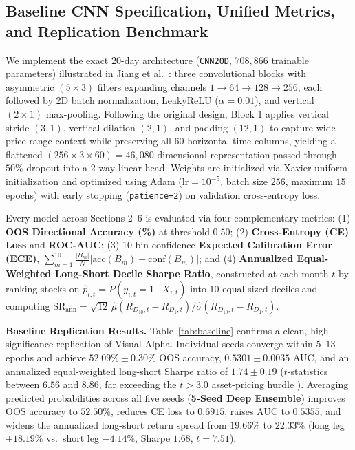 \documentclass[10pt]{article}
\begin{document}
\subsection{Baseline CNN Specification, Unified Metrics, and Replication Benchmark}
We implement the exact 20-day architecture (\texttt{CNN20D}, $708,866$ trainable parameters) illustrated in Jiang et al.\ \cite{jiang2023reimagining}: three convolutional blocks with asymmetric $(5 \times 3)$ filters expanding channels $1 \to 64 \to 128 \to 256$, each followed by 2D batch normalization, LeakyReLU ($\alpha = 0.01$), and vertical $(2 \times 1)$ max-pooling. Following the original design, Block 1 applies vertical stride $(3, 1)$, vertical dilation $(2, 1)$, and padding $(12, 1)$ to capture wide price-range context while preserving all 60 horizontal time columns, yielding a flattened $(256 \times 3 \times 60) = 46,080$-dimensional representation passed through $50\%$ dropout into a 2-way linear head. Weights are initialized via Xavier uniform initialization and optimized using Adam ($\text{lr} = 10^{-5}$, batch size $256$, maximum $15$ epochs) with early stopping (\texttt{patience=2}) on validation cross-entropy loss.

Every model across Sections 2--6 is evaluated via four complementary metrics: (1) \textbf{OOS Directional Accuracy (\%)} at threshold $0.50$; (2) \textbf{Cross-Entropy (CE) Loss} and \textbf{ROC-AUC}; (3) 10-bin confidence \textbf{Expected Calibration Error (ECE)}, $\sum_{m=1}^{10} \frac{|B_m|}{N} |\text{acc}(B_m) - \text{conf}(B_m)|$; and (4) \textbf{Annualized Equal-Weighted Long-Short Decile Sharpe Ratio}, constructed at each month $t$ by ranking stocks on $\hat{p}_{i,t} = P(y_{i,t}=1 \mid X_{i,t})$ into 10 equal-sized deciles and computing $\text{SR}_{\text{ann}} = \sqrt{12}\,\hat{\mu}(R_{D_{10},t} - R_{D_1,t}) / \hat{\sigma}(R_{D_{10},t} - R_{D_1,t})$.

\textbf{Baseline Replication Results.} Table~\ref{tab:baseline} confirms a clean, high-significance replication of Visual Alpha. Individual seeds converge within $5$--$13$ epochs and achieve $52.09\% \pm 0.30\%$ OOS accuracy, $0.5301 \pm 0.0035$ AUC, and an annualized equal-weighted long-short Sharpe ratio of $1.74 \pm 0.19$ ($t$-statistics between $6.56$ and $8.86$, far exceeding the $t > 3.0$ asset-pricing hurdle \cite{gu2020empirical}). Averaging predicted probabilities across all five seeds (\textbf{5-Seed Deep Ensemble}) improves OOS accuracy to $52.50\%$, reduces CE loss to $0.6915$, raises AUC to $0.5355$, and widens the annualized long-short return spread from $19.66\%$ to $22.33\%$ (long leg $+18.19\%$ vs.\ short leg $-4.14\%$, Sharpe $1.68$, $t = 7.51$).
\end{document}
